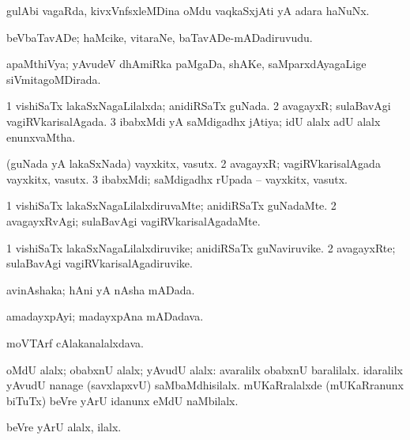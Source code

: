 \bentry
{}
\gl{\nA}
\bmng
gulAbi vagaRda, kivxVnfsxleMDina oMdu vaqkaSxjAti yA adara haNuNx. 
\emng
\eentry

\bentry
{}
\gl{\nA}
\bmng
beVbaTavADe; haMcike, vitaraNe, baTavADe-mADadiruvudu. 
\emng
\eentry

\bentry
{}
\gl{\gu}
\bmng
apaMthiVya; yAvudeV dhAmiRka paMgaDa, shAKe, saMparxdAyagaLige siVmitagoMDirada. 
\emng
\eentry

\bentry
{}
\gl{\gu}
\bmng
\bnum
\num{1} vishiSaTx lakaSxNagaLilalxda; anidiRSaTx guNada. 
\num{2} avagayxR; sulaBavAgi vagiRVkarisalAgada. 
\num{3} ibabxMdi yA saMdigadhx jAtiya; idU alalx adU alalx enunxvaMtha. 
\enum
\emng
\eentry

\bentry
{}
\gl{\nA}
\bmng
(guNada yA lakaSxNada) vayxkitx, vasutx. 
\bnum
\num{2} avagayxR; vagiRVkarisalAgada vayxkitx, vasutx. 
\num{3} ibabxMdi; saMdigadhx rUpada -- vayxkitx, vasutx. 
\enum
\emng
\eentry

\bentry
{}
\gl{\kirxvi}
\bmng
\bnum
\num{1} vishiSaTx lakaSxNagaLilalxdiruvaMte; anidiRSaTx guNadaMte. 
\num{2} avagayxRvAgi; sulaBavAgi vagiRVkarisalAgadaMte. 
\enum
\emng
\eentry

\bentry
{}
\gl{\nA}
\bmng
\bnum
\num{1} vishiSaTx lakaSxNagaLilalxdiruvike; anidiRSaTx guNaviruvike. 
\num{2} avagayxRte; sulaBavAgi vagiRVkarisalAgadiruvike. 
\enum
\emng
\eentry

\bentry
{}
\gl{\gu}
\bmng
avinAshaka; hAni yA nAsha mADada. 
\emng
\eentry

\bentry
{}
\gl{\nA}
\bmng
amadayxpAyi; madayxpAna mADadava. 
\emng
\eentry

\bentry
{}
\gl{\nA}
\bmng
moVTArf cAlakanalalxdava. 
\emng
\eentry

\bentry
{}
\gl{\sanA}
\bmng
oMdU alalx; obabxnU alalx; yAvudU alalx:  avaralilx obabxnU baralilalx.  idaralilx yAvudU nanage (savxlapxvU) saMbaMdhisilalx.  mUKaRralalxde (mUKaRranunx biTuTx) beVre yArU idanunx eMdU naMbilalx. 
\emng

\noindent
\gl{\pagu}
\bmng
{} beVre yArU alalx, ilalx. 
\emng
\eentry


